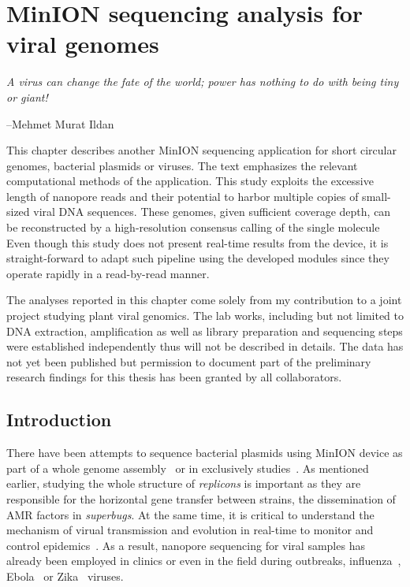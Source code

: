 \chapter{MinION sequencing analysis for viral genomes}\label{ch:concatemers}
\thispagestyle{empty}
\vspace*{\fill}
\epigraph{\emph{A virus can change the fate of the world; power has nothing to do with being tiny or giant!}}
{--Mehmet Murat Ildan}

\clearpage

This chapter describes another MinION sequencing application for short circular genomes, \EG{} bacterial plasmids or viruses. The text emphasizes the relevant computational methods of the application. 
This study exploits the excessive length of nanopore reads and their potential to harbor multiple copies of small-sized viral DNA sequences. These genomes, given sufficient coverage depth, can be reconstructed by a high-resolution consensus calling of the single molecule 
Even though this study does not present real-time results from the device, it is straight-forward to adapt such pipeline using the developed modules since they operate rapidly in a read-by-read manner.

The analyses reported in this chapter come solely from my contribution to a joint project studying plant viral genomics. 
The lab works, including but not limited to DNA extraction, amplification as well as library preparation and sequencing steps were established independently thus will not be described in details.
The data has not yet been published but permission to document part of the preliminary research findings for this thesis has been granted by all collaborators.
\section{Introduction}
There have been attempts to sequence bacterial plasmids using MinION device as part of a whole genome assembly~\cite{Lemon2017M15,Wick2017M12} or in exclusively studies~\cite{Li2018M13,Lu2018plamids}. As mentioned earlier, studying the whole structure of \emph{replicons} is important as they are responsible for the horizontal gene transfer between strains, \EG{} the dissemination of AMR factors in \emph{superbugs}.
At the same time, it is critical to understand the mechanism of virual transmission and evolution in real-time to monitor and control  epidemics~\cite{GardyLR2015,AndersenSM2015,HolmesDR2016,DudasCB2017}.
As a result, nanopore sequencing for viral samples has already been employed in clinics or even in the field during outbreaks, \EG{} influenza~\cite{Wang2015minion}, Ebola~\cite{QuickLD2016} or Zika~\cite{Quick2017GP} viruses.

